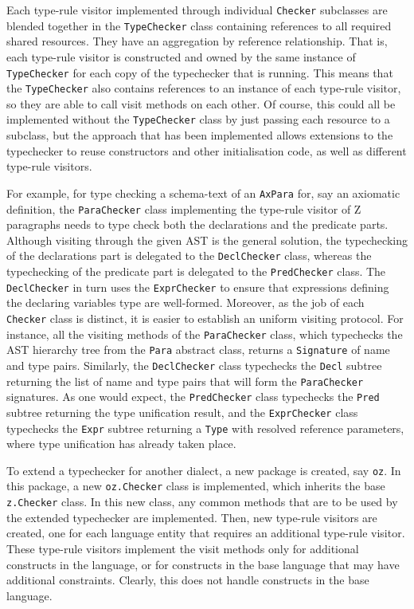 \documentclass{llncs}
\begin{document}
Each type-rule visitor implemented through individual {\tt Checker} subclasses
are blended together in the {\tt TypeChecker} class containing references to all
required shared resources. They have an aggregation by reference relationship.
That is, each type-rule visitor is constructed and owned by the same instance of
{\tt TypeChecker} for each copy of the typechecker that is running.
This means that the {\tt TypeChecker} also contains references to an instance
of each type-rule visitor, so they are able to call visit methods on each other.
Of course, this could all be implemented without the {\tt TypeChecker} class by just
passing each resource to a subclass, but the approach that has been implemented allows
extensions to the typechecker to reuse constructors and other initialisation code,
as well as different type-rule visitors.

For example, for type checking a schema-text of an {\tt AxPara} for, say an
axiomatic definition, the {\tt ParaChecker} class implementing the type-rule visitor of Z
paragraphs needs to type check both the declarations and the predicate parts.
Although visiting through the given AST is the
general solution, the typechecking of the declarations part is delegated to the {\tt DeclChecker} class,
whereas the typechecking of the predicate part is delegated to the {\tt PredChecker} class.
The {\tt DeclChecker} in turn uses the {\tt ExprChecker} to ensure that expressions defining the
declaring variables type are well-formed.
Moreover, as the job of each {\tt Checker} class is distinct, it is easier to establish an
uniform visiting protocol. For instance, all the visiting methods of the {\tt ParaChecker} class,
which typechecks the AST hierarchy tree from the {\tt Para} abstract class, returns a {\tt Signature}
of name and type pairs. Similarly, the {\tt DeclChecker} class typechecks the {\tt Decl} subtree
returning the list of name and type pairs that will form the {\tt ParaChecker} signatures.
As one would expect, the {\tt PredChecker} class typechecks the {\tt Pred} subtree
returning the type unification result, and the {\tt ExprChecker} class typechecks the {\tt Expr} subtree
returning a {\tt Type} with resolved reference parameters, where type unification has already taken place.

To extend a typechecker for another dialect, a new package is created, say {\tt oz}.
In this package, a new {\tt oz.Checker} class is implemented, which
inherits the base {\tt z.Checker} class. In this new class, any common
methods that are to be used by the extended typechecker are implemented.
Then, new type-rule visitors are created, one for each language entity that
requires an additional type-rule visitor.  These type-rule visitors
implement the visit methods only for additional constructs in the
language, or for constructs in the base language that may have
additional constraints. Clearly, this does not handle constructs in
the base language.
\end{document}

